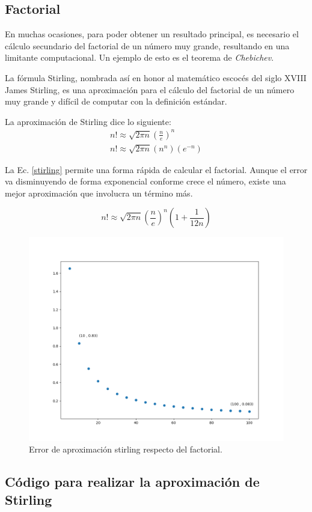 \newpage
\subsection{Factorial}
En muchas ocasiones, para poder obtener un resultado principal, es necesario el
c\'alculo secundario del factorial de un n\'umero muy grande, resultando en una
limitante computacional. Un ejemplo de esto es el teorema de \textit{Chebichev}.

La f\'ormula Stirling, nombrada así en honor al matem\'atico escoc\'es del siglo
XVIII James Stirling, es una aproximaci\'on para el c\'alculo del factorial de
un n\'umero muy grande y dif\'icil de computar con la definici\'on est\'andar.

La aproximaci\'on de Stirling dice lo siguiente:
\begin{eqnarray}
	n!\approx \sqrt{2\pi n}(\frac{n}{e})^n\\
	n!\approx \sqrt{2\pi n} (n^n)(e^{-n})
	\label{stirling}
\end{eqnarray}

La Ec. \eqref{stirling} permite una forma r\'apida de calcular el factorial.
Aunque el error va disminuyendo de forma exponencial conforme crece el n\'umero,
existe una mejor aproximaci\'on que involucra un t\'ermino m\'as.


\begin{equation}
	n!\approx \sqrt{2\pi n}(\frac{n}{e})^n(1+\frac{1}{12n})
	\label{Stirling}
\end{equation}
\begin{figure}[h!]
	\centering
\includegraphics[scale=0.30]{figures/stirling.png}
\caption{Error de aproximaci\'on stirling respecto del factorial.}
\label{stirling_error}
\end{figure}

\pagebreak
\subsection{Código para realizar la aproximación de Stirling}


